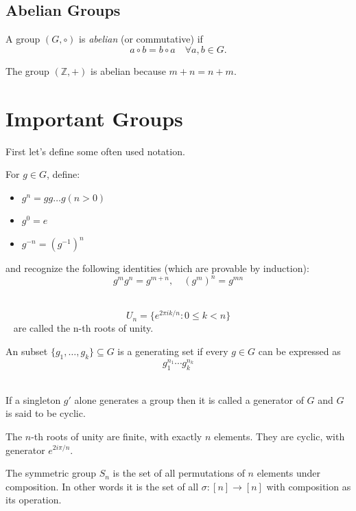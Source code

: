 \newpage
\subsection{Abelian Groups}

\begin{defn}
\label{defn:abelian_group}
A group $(G, \circ)$ is \emph{abelian} (or commutative) if
$$
a \circ b = b \circ a \quad \forall a,b \in G.
$$
\end{defn}

\begin{ex}
The group $(\mathbb{Z}, +)$ is abelian because $m+n = n+m$.
\end{ex}

\newpage 
\section{Important Groups}
First let's define some often used notation. 

For $g \in G$, define: 
\begin{itemize}
    \item $g^n = gg\ldots g(n > 0)$ 
    \item $g^0 = e$
    \item $g^{-n} = (g^{-1})^n$
\end{itemize} 
and recognize the following identities (which are provable 
by induction): 
$$ 
    g^m g^n = g^{m+n}, \quad (g^m)^n = g^{mn}
$$ 

\begin{defn}
    \label{defn:roots_of_unity}
    $$ 
        U_n = \{e^{2\pi ik/n} : 0 \leq k < n\}
    $$ 
    are called the n-th roots of unity.
\end{defn}

\begin{defn}
    An subset $\{g_1,\ldots,g_k\} \subseteq G$ is a generating set 
    if every $g \in G$ can be expressed as 
    $$ 
        g_1^{n_1} \cdots g_k^{n_k}
    $$ 

    If a singleton $g'$ alone generates a group then it is called 
    a generator of $G$ and $G$ is said to be cyclic. 
\end{defn}

The $n$-th roots of unity are finite, with exactly $n$ elements. 
They are cyclic, with generator $e^{2i\pi/n}$.

\begin{defn}
    \label{defn:symmetric_group}
    The symmetric group $S_n$ is the set of all permutations of 
    $n$ elements under composition. 
    In other words it is the set of all $\sigma : [n] \to [n]$ with 
    composition as its operation. 
\end{defn}

